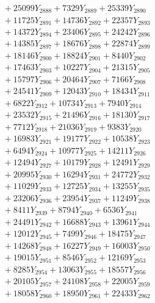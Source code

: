 \documentclass[a4paper,10pt]{article}
\begin{document}
{\begin{align}
&\;  + 25099 Y_{2888} + 7329 Y_{2889} + 25339 Y_{2890} \\[0.3ex]
&\;  + 11725 Y_{2891} + 14736 Y_{2892} + 22357 Y_{2893} \\[0.3ex]
&\;  + 14372 Y_{2894} + 23406 Y_{2895} + 24242 Y_{2896} \\[0.3ex]
&\;  + 14385 Y_{2897} + 18676 Y_{2898} + 22874 Y_{2899} \\[0.3ex]
&\;  + 18146 Y_{2900} + 18824 Y_{2901} + 8440 Y_{2902} \\[0.3ex]
&\;  + 17463 Y_{2903} + 10227 Y_{2904} + 21315 Y_{2905} \\[0.3ex]
&\;  + 15797 Y_{2906} + 20464 Y_{2907} + 7166 Y_{2908} \\[0.5ex]\allowbreak
&\;  + 24541 Y_{2909} + 12043 Y_{2910} + 18434 Y_{2911} \\[0.3ex]
&\;  + 6822 Y_{2912} + 10734 Y_{2913} + 7940 Y_{2914} \\[0.3ex]
&\;  + 23532 Y_{2915} + 21496 Y_{2916} + 18130 Y_{2917} \\[0.3ex]
&\;  + 7712 Y_{2918} + 21036 Y_{2919} + 9383 Y_{2920} \\[0.3ex]
&\;  + 16983 Y_{2921} + 19177 Y_{2922} + 10538 Y_{2923} \\[0.3ex]
&\;  + 6494 Y_{2924} + 10977 Y_{2925} + 14211 Y_{2926} \\[0.3ex]
&\;  + 12494 Y_{2927} + 10179 Y_{2928} + 12491 Y_{2929} \\[0.3ex]
&\;  + 20995 Y_{2930} + 16294 Y_{2931} + 24772 Y_{2932} \\[0.3ex]
&\;  + 11029 Y_{2933} + 12725 Y_{2934} + 13255 Y_{2935} \\[0.3ex]
&\;  + 23206 Y_{2936} + 23954 Y_{2937} + 11249 Y_{2938} \\[0.5ex]\allowbreak
&\;  + 8411 Y_{2939} + 8794 Y_{2940} + 6536 Y_{2941} \\[0.3ex]
&\;  + 24491 Y_{2942} + 16688 Y_{2943} + 13961 Y_{2944} \\[0.3ex]
&\;  + 12012 Y_{2945} + 7499 Y_{2946} + 18475 Y_{2947} \\[0.3ex]
&\;  + 14268 Y_{2948} + 16227 Y_{2949} + 16003 Y_{2950} \\[0.3ex]
&\;  + 19015 Y_{2951} + 8546 Y_{2952} + 12169 Y_{2953} \\[0.3ex]
&\;  + 8285 Y_{2954} + 13063 Y_{2955} + 18557 Y_{2956} \\[0.3ex]
&\;  + 20105 Y_{2957} + 24108 Y_{2958} + 22005 Y_{2959} \\[0.3ex]
&\;  + 18058 Y_{2960} + 18950 Y_{2961} + 22433 Y_{2962} \\[0.3ex]

\end{align}}
\end{document}
